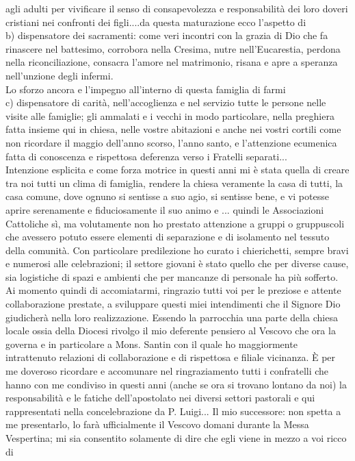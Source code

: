agli adulti per vivificare il senso di consapevolezza e responsabilità dei loro doveri cristiani nei confronti dei figli....da questa maturazione ecco l'aspetto di\\
b) dispensatore dei sacramenti: come veri incontri con la grazia di Dio che fa rinascere nel battesimo, corrobora nella Cresima, nutre nell'Eucarestia, perdona nella riconciliazione, 
consacra l'amore nel matrimonio, risana e apre a speranza nell'unzione degli infermi.\\Lo sforzo ancora e l'impegno all'interno di questa famiglia di farmi\\
c) dispensatore di carità, nell'accoglienza e nel servizio tutte le persone nelle visite alle famiglie; gli ammalati e i vecchi in modo particolare, nella preghiera fatta insieme qui in chiesa,
nelle vostre abitazioni e anche nei vostri cortili come non ricordare il maggio dell'anno scorso, l'anno santo, e l'attenzione ecumenica fatta di conoscenza 
e rispettosa deferenza verso i Fratelli separati...\\
Intenzione esplicita e come forza motrice in questi anni mi è stata quella di creare tra noi tutti un clima di famiglia, rendere la chiesa veramente la casa di tutti, la casa comune, dove ognuno si
sentisse a suo agio, si sentisse bene, e vi potesse aprire serenamente e fiduciosamente il suo animo e ...
quindi le Associazioni Cattoliche sì, ma volutamente non ho prestato attenzione a gruppi o gruppuscoli che avessero potuto essere elementi di separazione e di isolamento nel tessuto della
comunità. Con particolare predilezione ho curato i chierichetti, sempre bravi e numerosi alle celebrazioni; il settore giovani è stato quello che per diverse cause, 
sia logistiche di spazi e ambienti che per mancanze di personale ha più sofferto.
Ai momento quindi di accomiatarmi, ringrazio tutti voi per le preziose e attente collaborazione prestate, a sviluppare questi miei intendimenti che il Signore Dio giudicherà nella 
loro realizzazione.
Essendo la parrocchia una parte della chiesa locale ossia della Diocesi rivolgo il mio deferente pensiero al Vescovo che ora la governa e in particolare a Mons. Santin con il quale
ho maggiormente intrattenuto relazioni di collaborazione e di rispettosa e filiale vicinanza.
È per me doveroso ricordare e accomunare nel ringraziamento tutti i confratelli che hanno con me condiviso in questi anni (anche se ora si trovano lontano da noi) 
la responsabilità e le fatiche dell'apostolato nei diversi settori pastorali e qui rappresentati nella concelebrazione da P. Luigi... 
Il mio successore: non spetta a me presentarlo, lo farà ufficialmente il Vescovo domani durante la Messa Vespertina; mi sia consentito solamente di dire che egli viene in mezzo a voi ricco di
